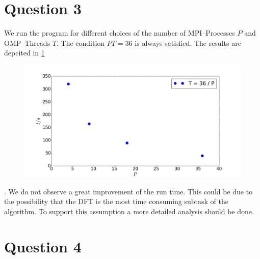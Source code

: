 \section*{Question 3}

We run the program for different choices of the number of MPI--Processes $P$ and OMP--Threads $T$. The condition $PT = 36$ is always satisfied. The results are depcited in \ref{fig:pt}\begin{figure}[h] 
  \centering
     \includegraphics[width=\textwidth]{pic/pt.png}
  \caption{}
  \label{fig:pt}
\end{figure}. We do not observe a great improvement of the run time. This could be due to the possibility that the DFT is the most time consuming subtask of the algorithm. To support this assumption a more detailed analysis should be done.




\section*{Question 4}


